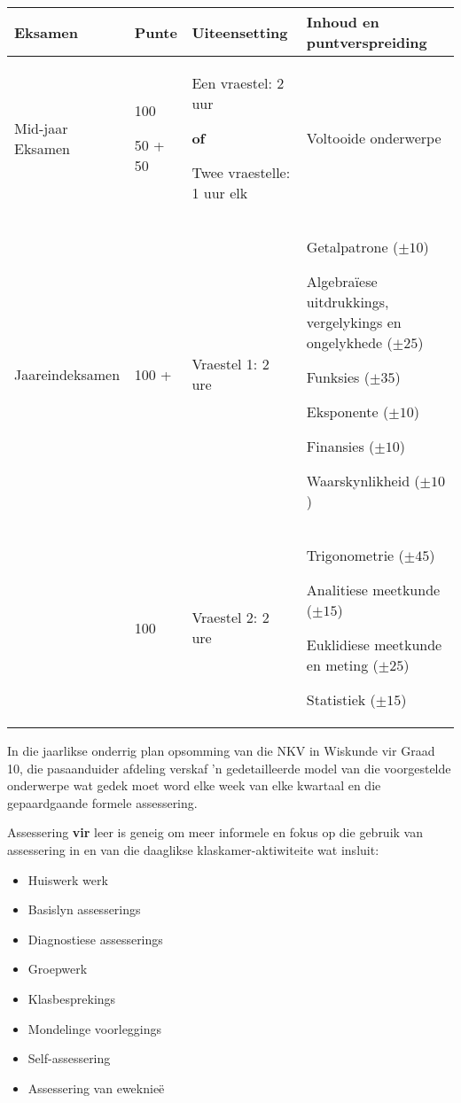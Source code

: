 \begin{table}[H]
\begin{center}
\begin{tabular} {|p{2cm}|p{1.5cm}|p{3cm}|p{4.5cm}|} \hline
\textbf{Eksamen} &
\textbf{Punte} &
\textbf{Uiteensetting} &
\textbf{Inhoud en puntverspreiding} \\ \hline
Mid-jaar Eksamen &
100 \par 50 + 50 &
Een vraestel: 2 uur\par \textbf{of} \par
Twee vraestelle: 1 uur elk &
Voltooide onderwerpe \\ \hline
Jaareindeksamen	&
100 + &
Vraestel 1: 2 ure &
Getalpatrone ($\pm 10$) \par 
Algebraïese uitdrukkings, vergelykings en ongelykhede ($\pm 25$)\par 
Funksies ($\pm 35$)\par 
Eksponente ($\pm 10$)\par 
Finansies ($\pm 10$)\par 
Waarskynlikheid ($\pm 10$)
\\ \hline
&
100 &
Vraestel 2: 2 ure &
Trigonometrie ($\pm 45$) \par 
Analitiese meetkunde ($\pm 15$)\par 
Euklidiese meetkunde en meting ($\pm 25$)\par 
Statistiek ($\pm 15$)
\\ \hline
\end{tabular}
 \end{center}
\end{table}

In die jaarlikse onderrig plan opsomming van die NKV in Wiskunde vir Graad 10, die pasaanduider afdeling verskaf 'n gedetailleerde model van die voorgestelde onderwerpe wat gedek moet word elke week van elke kwartaal en die gepaardgaande formele assessering.

Assessering \textbf{vir} leer is geneig om meer informele en fokus op die gebruik van assessering in en van die daaglikse klaskamer-aktiwiteite wat insluit:
\begin{itemize}[noitemsep]
\item
Huiswerk werk
\item
Basislyn assesserings
\item
Diagnostiese assesserings
\item
Groepwerk
\item
Klasbesprekings
\item
Mondelinge voorleggings
\item
Self-assessering
\item
Assessering van eweknieë
\end{itemize}

